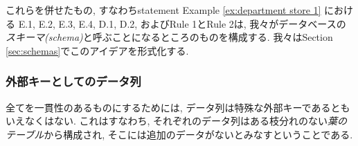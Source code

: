 
これらを併せたもの, すなわちstatement Example \ref{ex:department store 1} における E.1, E.2, E.3, E.4, D.1, D.2, およびRule 1とRule 2は, 我々がデータベースの\emph{スキーマ(schema)}と呼ぶことになるところのものを構成する.  我々はSection \ref{sec:schemas}でこのアイデアを形式化する.


\subsubsection{外部キーとしてのデータ列}


全てを一貫性のあるものにするためには, データ列は特殊な外部キーであるともいえなくはない. これはすなわち, それぞれのデータ列はある枝分れのない\emph{葉のテーブル}から構成され, そこには追加のデータがないとみなすということである.

